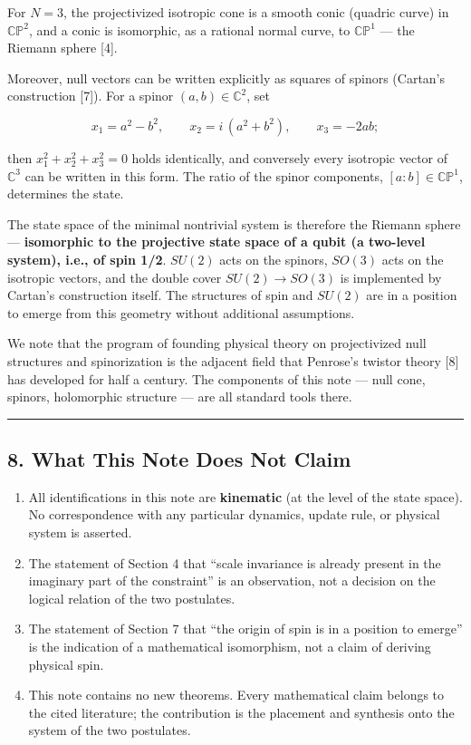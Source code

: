 \documentclass[
  a4paper,
]{article}
\providecommand{\tightlist}{%
  \setlength{\itemsep}{0pt}\setlength{\parskip}{0pt}}
\begin{document}
For \(N=3\), the projectivized isotropic cone is a smooth conic (quadric
curve) in \(\mathbb{CP}^2\), and a conic is isomorphic, as a rational
normal curve, to \(\mathbb{CP}^1\) --- the Riemann sphere {[}4{]}.

Moreover, null vectors can be written explicitly as squares of spinors
(Cartan's construction {[}7{]}). For a spinor \((a,b)\in\mathbb C^2\),
set

\[
x_1=a^2-b^2,\qquad x_2=i\,(a^2+b^2),\qquad x_3=-2ab;
\]

then \(x_1^2+x_2^2+x_3^2=0\) holds identically, and conversely every
isotropic vector of \(\mathbb C^3\) can be written in this form. The
ratio of the spinor components, \([a:b]\in\mathbb{CP}^1\), determines
the state.

The state space of the minimal nontrivial system is therefore the
Riemann sphere --- \textbf{isomorphic to the projective state space of a
qubit (a two-level system), i.e., of spin 1/2}. \(SU(2)\) acts on the
spinors, \(SO(3)\) acts on the isotropic vectors, and the double cover
\(SU(2)\to SO(3)\) is implemented by Cartan's construction itself. The
structures of spin and \(SU(2)\) are in a position to emerge from this
geometry without additional assumptions.

We note that the program of founding physical theory on projectivized
null structures and spinorization is the adjacent field that Penrose's
twistor theory {[}8{]} has developed for half a century. The components
of this note --- null cone, spinors, holomorphic structure --- are all
standard tools there.

\begin{center}\rule{0.5\linewidth}{0.5pt}\end{center}

\subsection{8. What This Note Does Not
Claim}\label{what-this-note-does-not-claim}

\begin{enumerate}
\def\labelenumi{\arabic{enumi}.}
\tightlist
\item
  All identifications in this note are \textbf{kinematic} (at the level
  of the state space). No correspondence with any particular dynamics,
  update rule, or physical system is asserted.
\item
  The statement of Section 4 that ``scale invariance is already present
  in the imaginary part of the constraint'' is an observation, not a
  decision on the logical relation of the two postulates.
\item
  The statement of Section 7 that ``the origin of spin is in a position
  to emerge'' is the indication of a mathematical isomorphism, not a
  claim of deriving physical spin.
\item
  This note contains no new theorems. Every mathematical claim belongs
  to the cited literature; the contribution is the placement and
  synthesis onto the system of the two postulates.
\end{enumerate}
\end{document}
